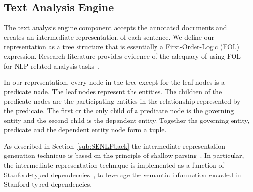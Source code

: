 %

\subsection{Text Analysis Engine}
\label{sub:TAE}
%

The text analysis engine component accepts the annotated documents and creates an intermediate representation of each sentence.
We define our representation as a tree structure that is essentially a First-Order-Logic (FOL) expression.
Research literature provides evidence of the adequacy of using FOL for NLP related analysis tasks~\cite{Sinha2009,Sinha2010,pandita12:inferring, pandita13:WHYPER}.

In our representation, every node in the tree except for the leaf nodes is a predicate node. 
The leaf nodes represent the entities.
The children of the predicate nodes are the participating entities in the relationship represented by the predicate.
The first or the only child of a predicate node is the governing entity and the second child is the dependent entity.
Together the governing entity, predicate and the dependent entity node form a tuple.  


As described in Section~\ref{sub:SENLPback} the intermediate representation generation technique is based on the principle of shallow parsing~\cite{Branimir2000}. 
In particular, the intermediate-representation technique is implemented as a function of Stanford-typed dependencies~\cite{Marneffe06LREC,Marneffe08COLING,SNLP,KleinNIPS03}, to leverage the semantic information encoded in Stanford-typed dependencies.



